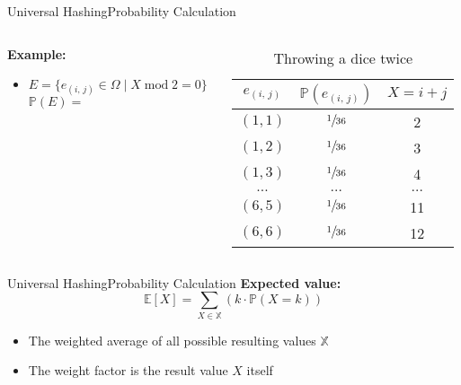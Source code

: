 \begin{frame}{Universal Hashing}{Probability Calculation}
  \begin{columns}
    \begin{column}{0.55\linewidth}
      \textbf{Example:}
      \begin{itemize}
        \item
          $E = \{e_{(i,\,j)} \in \Omega
          \mid X \;\mathrm{mod}\; 2 = 0\}$\\
          $\mathbb{P}(E) =$
      \end{itemize}
    \end{column}
    \begin{column}{0.45\linewidth}
      \begin{table}[!h]
        \caption{Throwing a dice twice}
        \label{tab:probabilities:rolling_dice_twice3}
        \begin{tabularx}{0.95\linewidth}{c|cc}
          $e_{(i,\,j)}$ & $\mathbb{P}(e_{(i,\,j)})$ & $X = i + j$\\
          \midrule
          $(1, 1)$ & $\sfrac{1}{36}$ & 2\\
          $(1, 2)$ & $\sfrac{1}{36}$ & 3\\
          $(1, 3)$ & $\sfrac{1}{36}$ & 4\\
          $\dots$ & $\dots$ & $\dots$\\
          $(6, 5)$ & $\sfrac{1}{36}$ & 11\\
          $(6, 6)$ & $\sfrac{1}{36}$ & 12\\
        \end{tabularx}
      \end{table}
    \end{column}
  \end{columns}
\end{frame}


\begin{frame}{Universal Hashing}{Probability Calculation}
  \textbf{Expected value:}
  \[\mathbb{E}[X]
    = \sum_{X \in \mathbb{X}} \left(k \cdot \mathbb{P}(X = k)\right)\]
  \begin{itemize}
    \item
      The weighted average of all possible resulting values $\mathbb{X}$
    \item
      The weight factor is the result value $X$ itself
  \end{itemize}
\end{frame}

